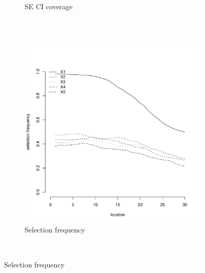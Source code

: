 \documentclass[authoryear, review, 11pt]{elsarticle}
\begin{document}
\begin{figure}
\begin{subfigure}[b]{0.45\textwidth}
		\caption{SE CI coverage}
	\end{subfigure}%
	\\%
	~ %
	\begin{subfigure}[b]{0.45\textwidth}
	\centering
		\includegraphics[width=\textwidth]{../../figures/simulation/15.32.profile_selection.pdf}
		\caption{Selection frequency}
	\end{subfigure}
	~ %

\end{figure}
\end{document}
